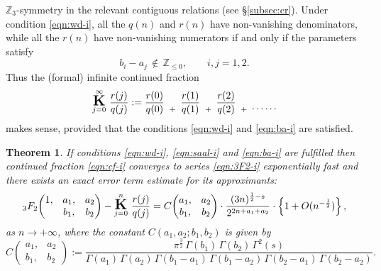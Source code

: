 \documentclass[a4paper,12pt]{article}
\theoremstyle{plain}
\newtheorem{theorem}{Theorem}[section]
\def\Z{\mathbb{Z}}
\def\vG{\varGamma}
\def\cfL{\mbox{\Large \boldmath $\mathrm{K}$}}
\begin{document}
$\Z_3$-symmetry in the relevant contiguous relations 
(see \S\ref{subsec:cr}).  
Under condition \eqref{eqn:wd-i}, all the $q(n)$ and $r(n)$ have  
non-vanishing denominators, while all the $r(n)$ have non-vanishing 
numerators if and only if the parameters satisfy     
\begin{equation} \label{eqn:ba-i}
b_i - a_j \, \not\in \, \Z_{\le 0}, \qquad i, j = 1, 2.      
\end{equation}
Thus the (formal) infinite continued fraction  
\begin{equation} \label{eqn:cf-i}
\overset{\infty}{\underset{j=0}{\cfL}} \,\, \frac{r(j)}{q(j)} 
:= \frac{r(0)}{q(0)} \,\, \mathop{}_{+} \,\, \frac{r(1)}{q(1)} 
\,\, \mathop{}_{+} \,\, \frac{r(2)}{q(2)} \, \, \mathop{}_{+} \,\, 
\mathop{}_{\textstyle \cdots\cdots} 
\end{equation}
makes sense, provided that the conditions \eqref{eqn:wd-i} and \eqref{eqn:ba-i} 
are satisfied.  
\begin{theorem} \label{thm:ete-i}
If conditions \eqref{eqn:wd-i}, \eqref{eqn:saal-i} and 
\eqref{eqn:ba-i} are fulfilled then continued fraction 
\eqref{eqn:cf-i} converges to series \eqref{eqn:3F2-i} 
exponentially fast and there exists an exact error term estimate 
for its approximants:    
\begin{equation*} 
{}_3F_2\! 
\begin{pmatrix} 
1, & a_1, & a_2 \\ 
     & b_1, & b_2    
\end{pmatrix} - 
\overset{n}{\underset{j=0}{\cfL}} \,\, \frac{r(j)}{q(j)} 
= C\! 
\begin{pmatrix} 
a_1, & a_2 \\ 
b_1, & b_2 
\end{pmatrix} \cdot 
\dfrac{(3 n)^{ \frac{1}{2} - s}}{2^{2 n + a_1 + a_2}} \cdot 
\left\{1 + O( n^{- \frac{1}{2} } ) \right\},    
\end{equation*}
as $n \to +\infty$, where the constant $C(a_1, a_2; b_1, b_2)$ is given by   
\begin{equation*} 
C\! 
\begin{pmatrix} 
a_1, & a_2 \\ 
b_1, & b_2 
\end{pmatrix} := 
\dfrac{ \pi^{\frac{3}{2}} \, \vG(b_1) \, \vG(b_2) \, \vG^2(s) }{ \vG(a_1) \, 
\vG(a_2) \, \vG( b_1-a_1 ) \, \vG( b_1 -a_2 ) \, \vG( b_2 -a_1 ) \, \vG( b_2 -a_2 ) }. 
\end{equation*}
\end{theorem}
\end{document}
